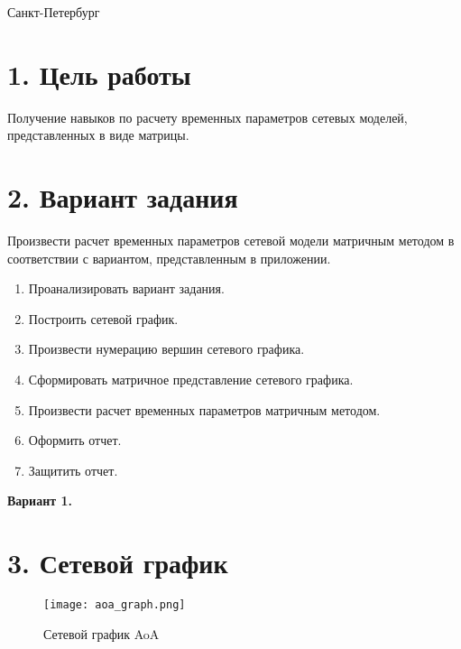 \documentclass[12pt]{article}
\begin{document}
\begin{titlepage}
\begin{table}[H]
\begin{tabular}{p{1.3in}p{1.0in}p{-0.04in}p{1.63in}p{-0.04in}p{1.63in}}
\end{tabular}
 \end{table}




\vspace{\baselineskip}
\vspace{\baselineskip}
\vspace{\baselineskip}
\vspace{\baselineskip}
\vspace{\baselineskip}
\begin{Center}
Санкт-Петербург \the\year{}
\end{Center}\par
\end{titlepage}

\section*{1. Цель работы}
Получение навыков по расчету временных параметров сетевых моделей, представленных в виде матрицы.

\section*{2. Вариант задания}
Произвести расчет временных параметров сетевой модели матричным методом в соответствии с вариантом, представленным в приложении.

\begin{enumerate}
    \item Проанализировать вариант задания.
    \item Построить сетевой график.
    \item Произвести нумерацию вершин сетевого графика.
    \item Сформировать матричное представление сетевого графика.
    \item Произвести расчет временных параметров матричным методом.
    \item Оформить отчет.
    \item Защитить отчет.
\end{enumerate}

\textbf{Вариант 1.}

\section*{3. Сетевой график}
\begin{figure}[H]
    \centering
    \texttt{[image: aoa\_graph.png]}
    \caption{Сетевой график AoA}
\end{figure}
\end{document}
